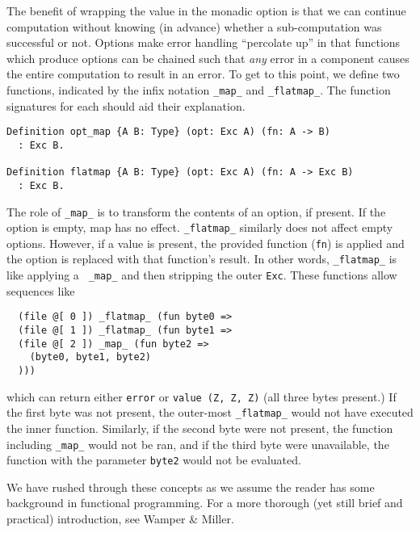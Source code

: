 \documentclass[nocopyrightspace]{sigplanconf}
\begin{document}
The benefit of wrapping the value in the monadic option is that we can
continue computation without knowing (in advance) whether a sub-computation
was successful or not. Options make error handling ``percolate up'' in that
functions which produce options can be chained such that {\em any} error in a
component causes the entire computation to result in an error. To get to this
point, we define two functions, indicated by the infix notation {\tt \_map\_}
and {\tt \_flatmap\_}. The function signatures for each should aid
their explanation.

\begin{lstlisting}
Definition opt_map {A B: Type} (opt: Exc A) (fn: A -> B)
  : Exc B.

Definition flatmap {A B: Type} (opt: Exc A) (fn: A -> Exc B)
  : Exc B.
\end{lstlisting}

The role of {\tt \_map\_} is to transform the contents of an option, if
present. If the option is empty, map has no effect. {\tt \_flatmap\_}
similarly does not affect empty options. However, if a value is present, the
provided function ({\tt fn}) is applied and the option is replaced with that
function's result. In other words, {\tt \_flatmap\_} is like applying a {\tt
\_map\_} and then stripping the outer {\tt Exc}. These functions allow
sequences like

\begin{lstlisting}
  (file @[ 0 ]) _flatmap_ (fun byte0 =>
  (file @[ 1 ]) _flatmap_ (fun byte1 =>
  (file @[ 2 ]) _map_ (fun byte2 =>
    (byte0, byte1, byte2)
  )))
\end{lstlisting}

which can return either {\tt error} or {\tt value (Z, Z, Z)} (all three bytes
present.) If the first byte was not present, the outer-most {\tt \_flatmap\_}
would not have executed the inner function. Similarly, if the second byte were
not present, the function including {\tt \_map\_} would not be ran, and if the
third byte were unavailable, the function with the parameter {\tt byte2} would
not be evaluated.

We have rushed through these concepts as we assume the reader has some
background in functional programming. For a more thorough (yet still brief and
practical) introduction, see Wamper \& Miller\cite{scala}.
\end{document}

